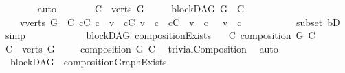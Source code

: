 \begin{isabellebody}
\ \ \ \ \ \ \isamarkupfalse%
\ auto\isanewline
\ \ \ \ \isamarkupfalse%
\ \isamarkupfalse%
\ {\isachardoublequoteopen}C\ {\isasymsubseteq}\ verts\ G\ {\isasymand}\isanewline
\ \ \ \ blockDAG\ {\isacharparenleft}{\kern0pt}G\ {\isasymrestriction}\ C{\isacharparenright}{\kern0pt}\ {\isasymand}\isanewline
\ \ \ \ {\isacharparenleft}{\kern0pt}{\isasymforall}v{\isasymin}verts\ G\ {\isacharminus}{\kern0pt}\ C{\isachardot}{\kern0pt}\ {\isacharparenleft}{\kern0pt}{\isasymforall}c{\isasymin}C{\isachardot}{\kern0pt}\ c\ {\isasymrightarrow}\isactrlsup {\isacharplus}{\kern0pt}\ v{\isacharparenright}{\kern0pt}\ {\isasymor}\ {\isacharparenleft}{\kern0pt}{\isasymforall}c{\isasymin}C{\isachardot}{\kern0pt}\ v\ {\isasymrightarrow}\isactrlsup {\isacharplus}{\kern0pt}\ c{\isacharparenright}{\kern0pt}\ {\isasymor}\ {\isacharparenleft}{\kern0pt}{\isasymforall}c{\isasymin}C{\isachardot}{\kern0pt}\ {\isasymnot}\ v\ {\isasymrightarrow}\isactrlsup {\isacharplus}{\kern0pt}\ c\ {\isasymand}\ {\isasymnot}\ v\ {\isasymrightarrow}\isactrlsup {\isacharplus}{\kern0pt}\ c{\isacharparenright}{\kern0pt}{\isacharparenright}{\kern0pt}{\isachardoublequoteclose}\ \isanewline
\ \ \ \ \ \ \ \ \isamarkupfalse%
\ subset\ bD\ \isamarkupfalse%
\ simp\isanewline
\ \ \ \ \isamarkupfalse%
\ \ \isanewline
\ \ \isamarkupfalse%
%
\endisatagproof
{\isafoldproof}%
%
\isadelimproof
\isanewline
%
\endisadelimproof
\isanewline
{}\isamarkupfalse%
\ {\isacharparenleft}{\kern0pt}\ blockDAG{\isacharparenright}{\kern0pt}\ compositionExists{\isacharcolon}{\kern0pt}\isanewline
\ \ \ {\isachardoublequoteopen}{\isasymexists}C{\isachardot}{\kern0pt}\ composition\ G\ C{\isachardoublequoteclose}\isanewline
%
\isadelimproof
%
\endisadelimproof
%
\isatagproof
{}\isamarkupfalse%
\isanewline
\ \ \isamarkupfalse%
\ {\isacharquery}{\kern0pt}C\ {\isacharequal}{\kern0pt}\ {\isachardoublequoteopen}verts\ G{\isachardoublequoteclose}\ \isanewline
\ \ \isamarkupfalse%
\ {\isachardoublequoteopen}composition\ G\ {\isacharquery}{\kern0pt}C{\isachardoublequoteclose}\ \isamarkupfalse%
\ trivialComposition\ \isamarkupfalse%
\ auto\ \isanewline
\ \ \isamarkupfalse%
%
\endisatagproof
{\isafoldproof}%
%
\isadelimproof
\isanewline
%
\endisadelimproof
\isanewline
{}\isamarkupfalse%
\ {\isacharparenleft}{\kern0pt}\ blockDAG{\isacharparenright}{\kern0pt}\ \ compositionGraphExists{\isacharcolon}{\kern0pt}\isanewline

\end{isabellebody}
